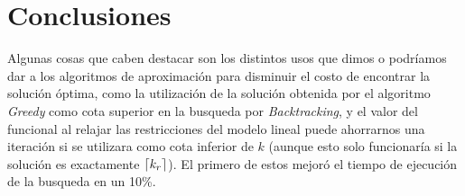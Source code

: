 \section{Conclusiones}

Algunas cosas que caben destacar son los distintos usos que dimos o podríamos
dar a los algoritmos de aproximación para disminuir el costo de encontrar la
solución óptima, como la utilización de la solución obtenida por el algoritmo
\textit{Greedy} como cota superior en la busqueda por \textit{Backtracking}, y
el valor del funcional al relajar las restricciones del modelo lineal puede
ahorrarnos una iteración si se utilizara como cota inferior de $k$ (aunque esto
solo funcionaría si la solución es exactamente $\lceil k_r\rceil$). El primero de
estos mejoró el tiempo de ejecución de la busqueda en un 10\%.
